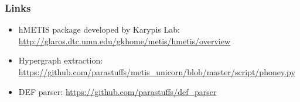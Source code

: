 \documentclass[a4paper,11pt]{article}
\begin{document}
\vspace*{2cm}
\subsubsection*{Links}
\begin{itemize}
\item hMETIS package developed by Karypis Lab: \url{http://glaros.dtc.umn.edu/gkhome/metis/hmetis/overview}
\item Hypergraph extraction: \url{https://github.com/parastuffs/metis_unicorn/blob/master/script/phoney.py}
\item DEF parser: \url{https://github.com/parastuffs/def_parser}
\end{itemize}
\end{document}
